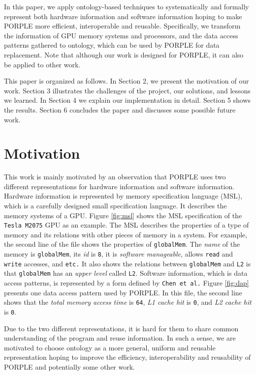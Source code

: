 \documentclass{sig-alternate}
\begin{document}
In this paper, we apply ontology-based techniques to systematically and formally represent both hardware information and software information hoping to make PORPLE more efficient, interoperable and reusable. Specifically, we transform the information of GPU memory systems and processors, and the data access patterns gathered to ontology, which can be used by PORPLE for data replacement. Note that although our work is designed for PORPLE, it can also be applied to other work.

This paper is organized as follows. In Section 2, we present the motivation of our work. Section 3 illustrates the challenges of the project, our solutions, and lessons we learned. In Section 4 we explain our implementation in detail. Section 5 shows the results. Section 6 concludes the paper and discusses some possible future work.

\section{Motivation}
This work is mainly motivated by an observation that PORPLE uses two different representations for hardware information and software information. Hardware information is represented by memory specification language (MSL), which is a carefully designed small specification language. It describes the memory systems of a GPU. Figure \ref{fig:msl} shows the MSL specification of the \texttt{Tesla M2075} GPU as an example. The MSL describes the properties of a type of memory and its relations with other pieces of memory in a system. For example, the second line of the file shows the properties of \texttt{globalMem}. The \textit{name} of the memory is \texttt{globalMem}, its \textit{id} is \texttt{8}, it is \textit{software manageable}, allows \texttt{read} and \texttt{write} accesses, and \texttt{etc.} It also shows the relations between \texttt{globalMem} and \texttt{L2} is that \texttt{globalMem} has an \textit{upper level} called \texttt{L2}. Software information, which is data access patterns, is represented by a form defined by \texttt{Chen et al.} \cite{porple} Figure \ref{fig:dap} presents one data access pattern used by PORPLE. In this file, the second line shows that the \textit{total memory access time} is \texttt{64}, \textit{L1 cache hit} is \texttt{0}, and \textit{L2 cache hit} is \texttt{0}.

Due to the two different representations, it is hard for them to share common understanding of the program and reuse information. In such a sense, we are motivated to choose ontology as a more general, uniform and reusable representation hoping to improve the efficiency, interoperability and reusability of PORPLE and potentially some other work.
\end{document}
